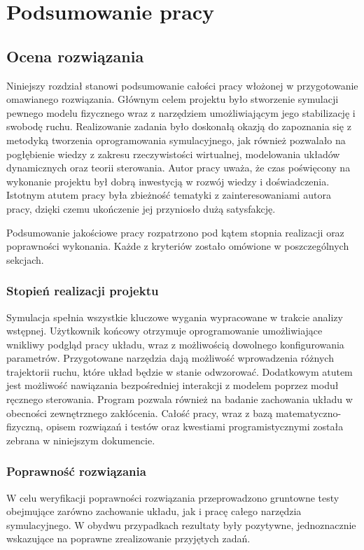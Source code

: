 \documentclass[12pt, twoside, openany]{report}
\theoremstyle{definition}
\begin{document}
\newpage
\chapter{Podsumowanie pracy}
\section{Ocena rozwiązania}
Niniejszy rozdział stanowi podsumowanie całości pracy włożonej w przygotowanie omawianego rozwiązania. Głównym celem projektu było stworzenie symulacji pewnego modelu fizycznego wraz z narzędziem umożliwiającym jego stabilizację i swobodę ruchu. Realizowanie zadania było doskonałą okazją do zapoznania się z metodyką tworzenia oprogramowania symulacyjnego, jak również pozwalało na pogłębienie wiedzy z zakresu rzeczywistości wirtualnej, modelowania układów dynamicznych oraz teorii sterowania. Autor pracy uważa, że czas poświęcony na wykonanie projektu był dobrą inwestycją w rozwój wiedzy i doświadczenia. Istotnym atutem pracy była zbieżność tematyki z zainteresowaniami autora pracy, dzięki czemu ukończenie jej przyniosło dużą satysfakcję. 

Podsumowanie jakościowe pracy rozpatrzono pod kątem stopnia realizacji oraz poprawności wykonania. Każde z kryteriów zostało omówione w poszczególnych sekcjach.

\subsection{Stopień realizacji projektu}
Symulacja spełnia wszystkie kluczowe wygania wypracowane w trakcie analizy wstępnej. Użytkownik końcowy otrzymuje oprogramowanie umożliwiające wnikliwy podgląd pracy układu, wraz z możliwością dowolnego konfigurowania parametrów. Przygotowane narzędzia dają możliwość wprowadzenia różnych trajektorii ruchu, które układ będzie w stanie odwzorować. Dodatkowym atutem jest możliwość nawiązania bezpośredniej interakcji z modelem poprzez moduł ręcznego sterowania. Program pozwala również na badanie zachowania układu w obecności zewnętrznego zakłócenia. Całość pracy, wraz z bazą matematyczno-fizyczną, opisem rozwiązań i testów oraz kwestiami programistycznymi została zebrana w niniejszym dokumencie.

\subsection{Poprawność rozwiązania}
W celu weryfikacji poprawności rozwiązania przeprowadzono gruntowne testy obejmujące zarówno zachowanie układu, jak i pracę całego narzędzia symulacyjnego. W obydwu przypadkach rezultaty były pozytywne, jednoznacznie wskazujące na poprawne zrealizowanie przyjętych zadań.
\end{document}
